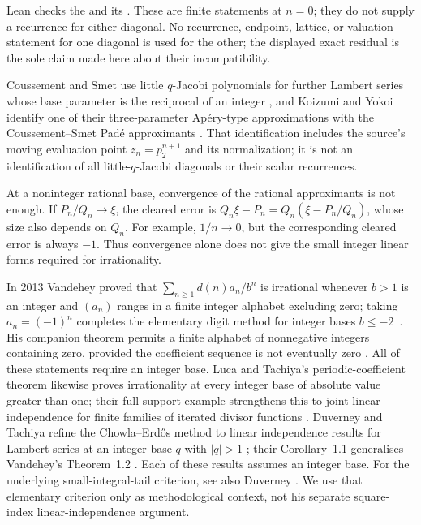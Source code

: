 Lean checks the
 and its
.  These are finite statements at $n=0$; they do not supply a
recurrence for either diagonal.  No recurrence, endpoint, lattice, or
valuation statement for one diagonal is used for the other; the displayed
exact residual is the sole claim made here about their incompatibility.

Coussement and Smet use little $q$-Jacobi polynomials for further Lambert
series whose base parameter is the reciprocal of an integer
\cite[Thms.~1.2--1.3, p.~2; Sec.~2]{coussementsmet2007}, and Koizumi and
Yokoi identify one of their three-parameter Ap\'ery-type approximations with
the Coussement--Smet Pad\'e approximants
\cite[Sec.~7, Prop.~7.1, p.~33]{koizumiyokoi2026}.
That identification includes the source's moving evaluation point
$z_n=p_2^{n+1}$ and its normalization; it is not an identification of
all little-$q$-Jacobi diagonals or their scalar recurrences.

At a noninteger rational base, convergence of the rational approximants
is not enough. If $P_n/Q_n\to\xi$, the cleared error is
$Q_n\xi-P_n=Q_n(\xi-P_n/Q_n)$, whose size also depends on $Q_n$.
For example, $1/n\to0$, but the corresponding cleared error is always
$-1$. Thus convergence alone does not give the small integer linear
forms required for irrationality.

In 2013 Vandehey proved that
$\sum_{n\ge1}d(n)a_n/b^n$ is irrational whenever $b>1$ is an integer and
$(a_n)$ ranges in a finite integer alphabet excluding zero; taking
$a_n=(-1)^n$ completes the elementary digit method for integer bases
$b\le-2$~\cite[Thm.~1.2, p.~2]{vandehey2013}.  His companion theorem permits
a finite alphabet of nonnegative integers containing zero, provided the
coefficient sequence is not eventually zero
\cite[Thm.~1.1, p.~2]{vandehey2013}.  All
of these statements require an integer base. Luca and Tachiya's periodic-coefficient theorem
likewise proves irrationality at every integer base of absolute value greater
than one; their full-support example strengthens this to joint linear
independence for finite families of iterated divisor functions
\cite[Theorem~A, p.~139; Example~1, p.~140]{lucatachiya2017}.  Duverney and
Tachiya refine the Chowla--Erd\H{o}s method to linear independence results for
Lambert series at an integer base $q$ with $|q|>1$
\cite[Thms.~1.1--1.2, pp.~2--3]{duverneytachiya2019}; their Corollary~1.1
generalises Vandehey's Theorem~1.2 \cite[p.~3]{duverneytachiya2019}.  Each of these results assumes an integer base.
For the underlying small-integral-tail criterion, see also Duverney
\cite[Thm.~2, p.~4 of the author manuscript]{duverney2011}.
We use that elementary criterion only as methodological context, not his
separate square-index linear-independence argument.


